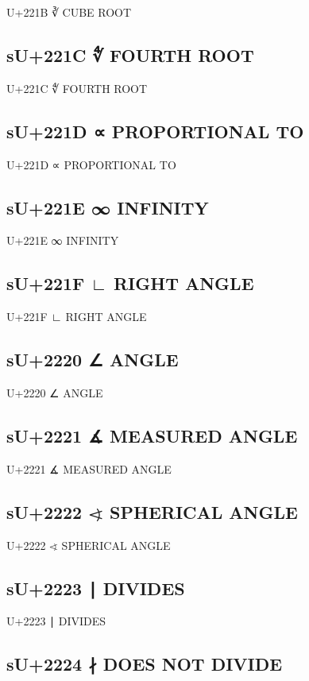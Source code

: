 U+221B ∛ CUBE ROOT

\subsection{sU+221C ∜ FOURTH ROOT}

U+221C ∜ FOURTH ROOT

\subsection{sU+221D ∝ PROPORTIONAL TO}

U+221D ∝ PROPORTIONAL TO

\subsection{sU+221E ∞ INFINITY}

U+221E ∞ INFINITY

\subsection{sU+221F ∟ RIGHT ANGLE}

U+221F ∟ RIGHT ANGLE

\subsection{sU+2220 ∠ ANGLE}

U+2220 ∠ ANGLE

\subsection{sU+2221 ∡ MEASURED ANGLE}

U+2221 ∡ MEASURED ANGLE

\subsection{sU+2222 ∢ SPHERICAL ANGLE}

U+2222 ∢ SPHERICAL ANGLE

\subsection{sU+2223 ∣ DIVIDES}

U+2223 ∣ DIVIDES

\subsection{sU+2224 ∤ DOES NOT DIVIDE}

